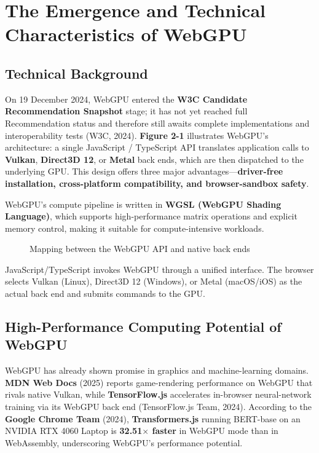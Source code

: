 \documentclass[12pt]{report}
\begin{document}
\section{The Emergence and Technical Characteristics of WebGPU}
\subsection{Technical Background}
On 19 December 2024, WebGPU entered the \textbf{W3C Candidate Recommendation Snapshot} stage; it has not yet reached full Recommendation status and therefore still awaits complete implementations and interoperability tests (W3C, 2024). \textbf{Figure 2-1} illustrates WebGPU’s architecture: a single JavaScript / TypeScript API translates application calls to \textbf{Vulkan}, \textbf{Direct3D 12}, or \textbf{Metal} back ends, which are then dispatched to the underlying GPU. This design offers three major advantages—\textbf{driver-free installation, cross-platform compatibility, and browser-sandbox safety}.

WebGPU’s compute pipeline is written in \textbf{WGSL (WebGPU Shading Language)}, which supports high-performance matrix operations and explicit memory control, making it suitable for compute-intensive workloads.

\begin{figure}[h]
    \caption{Mapping between the WebGPU API and native back ends}
    \label{fig:webgpu_stack}
\end{figure}

JavaScript/TypeScript invokes WebGPU through a unified interface. The browser selects Vulkan (Linux), Direct3D 12 (Windows), or Metal (macOS/iOS) as the actual back end and submits commands to the GPU.

\subsection{High-Performance Computing Potential of WebGPU}
WebGPU has already shown promise in graphics and machine-learning domains. \textbf{MDN Web Docs} (2025) reports game-rendering performance on WebGPU that rivals native Vulkan, while \textbf{TensorFlow.js} accelerates in-browser neural-network training via its WebGPU back end (TensorFlow.js Team, 2024). According to the \textbf{Google Chrome Team} (2024), \textbf{Transformers.js} running BERT-base on an NVIDIA RTX 4060 Laptop is \textbf{32.51$\times$ faster} in WebGPU mode than in WebAssembly, underscoring WebGPU’s performance potential.
\end{document}
